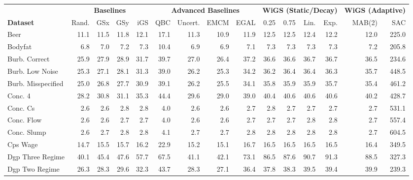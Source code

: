 \begin{table}[htbp]
    \centering
    \scriptsize
    \setlength{\tabcolsep}{2pt}
    \begin{tabular}{l rrrrrrrrrrrrrr}
        \toprule
         & \multicolumn{4}{c}{\textbf{Baselines}} & \multicolumn{4}{c}{\textbf{Advanced Baselines}} & \multicolumn{4}{c}{\textbf{WiGS (Static/Decay)}} & \multicolumn{2}{c}{\textbf{WiGS (Adaptive)}} \\
         \cmidrule(lr){2-5} \cmidrule(lr){6-9} \cmidrule(lr){10-13} \cmidrule(lr){14-15}
        \textbf{Dataset} & Rand. & GSx & GSy & iGS & QBC & Uncert. & EMCM & EGAL & 0.25 & 0.75 & Lin. & Exp. & MAB(2) & SAC \\ \midrule
        Beer & 11.1 & 11.5 & 11.8 & 12.1 & 17.1 & 11.3 & 10.9 & 11.9 & 12.5 & 12.5 & 12.4 & 12.2 & 12.0 & 225.0 \\
        Bodyfat & 6.8 & 7.0 & 7.2 & 7.3 & 10.4 & 6.9 & 6.9 & 7.1 & 7.3 & 7.3 & 7.3 & 7.3 & 7.2 & 205.8 \\
        Burb. Correct & 25.9 & 27.9 & 28.9 & 31.7 & 39.7 & 27.0 & 26.4 & 37.2 & 36.6 & 36.6 & 36.7 & 36.7 & 36.5 & 234.6 \\
        Burb. Low Noise & 25.3 & 27.1 & 28.1 & 31.3 & 39.0 & 26.2 & 25.3 & 34.2 & 36.2 & 36.4 & 36.4 & 36.3 & 35.7 & 448.5 \\
        Burb. Misspecified & 25.0 & 26.8 & 27.7 & 30.9 & 39.1 & 26.2 & 25.5 & 34.1 & 35.8 & 35.9 & 35.9 & 35.7 & 35.4 & 461.2 \\
        Conc. 4 & 28.2 & 30.8 & 31.1 & 35.3 & 44.4 & 29.6 & 29.0 & 39.0 & 40.4 & 40.6 & 40.6 & 40.6 & 40.2 & 428.7 \\
        Conc. Cs & 2.6 & 2.6 & 2.8 & 2.8 & 4.0 & 2.6 & 2.6 & 2.7 & 2.8 & 2.7 & 2.7 & 2.7 & 2.7 & 531.1 \\
        Conc. Flow & 2.6 & 2.6 & 2.7 & 2.7 & 4.0 & 2.6 & 2.6 & 2.7 & 2.7 & 2.7 & 2.8 & 2.8 & 2.7 & 557.4 \\
        Conc. Slump & 2.6 & 2.7 & 2.8 & 2.8 & 4.1 & 2.7 & 2.7 & 2.8 & 2.8 & 2.8 & 2.8 & 2.8 & 2.7 & 604.5 \\
        Cps Wage & 14.7 & 15.5 & 15.7 & 16.2 & 22.9 & 15.2 & 15.1 & 16.7 & 16.5 & 16.5 & 16.5 & 16.5 & 16.4 & 349.5 \\
        Dgp Three Regime & 40.1 & 45.4 & 47.6 & 57.7 & 67.5 & 41.1 & 42.1 & 73.1 & 86.5 & 87.6 & 90.7 & 91.3 & 88.5 & 327.3 \\
        Dgp Two Regime & 26.3 & 28.3 & 29.6 & 32.3 & 43.7 & 28.3 & 27.1 & 36.4 & 37.8 & 38.3 & 39.5 & 39.4 & 39.9 & 239.3 \\

\end{tabular}
\end{table}
